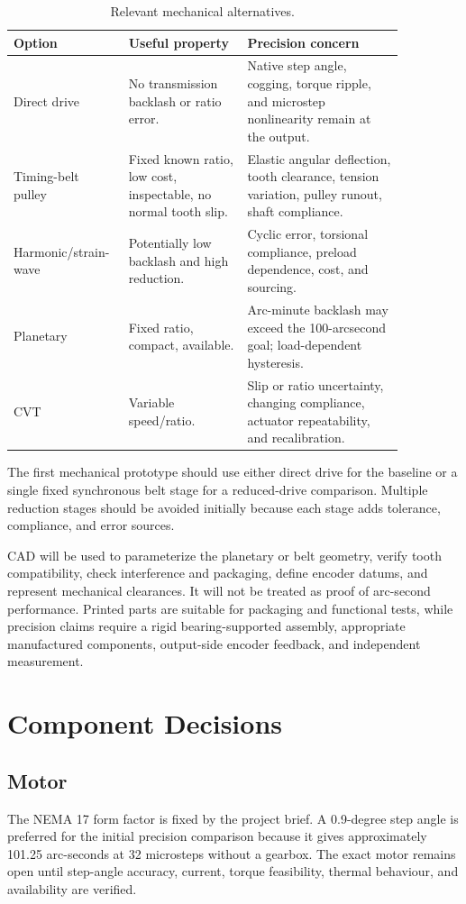 \documentclass[11pt,a4paper]{article}
\begin{document}
\begin{table}[ht]
\centering
\small
\begin{tabular}{p{0.20\linewidth}p{0.29\linewidth}p{0.37\linewidth}}
\toprule
\textbf{Option} & \textbf{Useful property} & \textbf{Precision concern} \\
\midrule
Direct drive & No transmission backlash or ratio error. & Native step angle, cogging, torque ripple, and microstep nonlinearity remain at the output. \\
Timing-belt pulley & Fixed known ratio, low cost, inspectable, no normal tooth slip. & Elastic angular deflection, tooth clearance, tension variation, pulley runout, shaft compliance. \\
Harmonic/strain-wave & Potentially low backlash and high reduction. & Cyclic error, torsional compliance, preload dependence, cost, and sourcing. \\
Planetary & Fixed ratio, compact, available. & Arc-minute backlash may exceed the 100-arcsecond goal; load-dependent hysteresis. \\
CVT & Variable speed/ratio. & Slip or ratio uncertainty, changing compliance, actuator repeatability, and recalibration. \\
\bottomrule
\end{tabular}
\caption{Relevant mechanical alternatives.}
\end{table}

The first mechanical prototype should use either direct drive for the baseline or a single fixed synchronous belt stage for a reduced-drive comparison. Multiple reduction stages should be avoided initially because each stage adds tolerance, compliance, and error sources.

CAD will be used to parameterize the planetary or belt geometry, verify tooth compatibility, check interference and packaging, define encoder datums, and represent mechanical clearances. It will not be treated as proof of arc-second performance. Printed parts are suitable for packaging and functional tests, while precision claims require a rigid bearing-supported assembly, appropriate manufactured components, output-side encoder feedback, and independent measurement.

\section{Component Decisions}

\subsection{Motor}
The NEMA 17 form factor is fixed by the project brief. A 0.9-degree step angle is preferred for the initial precision comparison because it gives approximately 101.25 arc-seconds at 32 microsteps without a gearbox. The exact motor remains open until step-angle accuracy, current, torque feasibility, thermal behaviour, and availability are verified.
\end{document}

